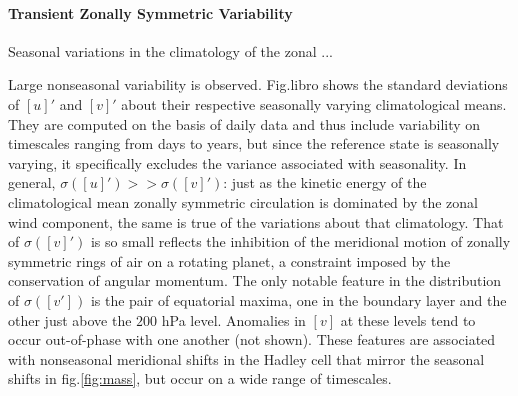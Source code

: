 \paragraph{Transient Zonally Symmetric Variability}
Seasonal variations in the climatology of the zonal ...

Large nonseasonal variability is observed. Fig.libro shows the standard deviations of $[u]'$ and $[v]'$ about their respective seasonally varying climatological means. They are computed on the basis of daily data and thus include variability on timescales ranging from days to years, but since the reference state is seasonally varying, it specifically excludes the variance associated with seasonality. In general, $\sigma([u]')>>\sigma([v]')$: just as the kinetic energy of the climatological mean zonally symmetric circulation is dominated by the zonal wind component, the same is true of the variations about that climatology. That of $\sigma([v]')$ is so small reflects the inhibition of the meridional motion of zonally symmetric rings of air on a rotating planet, a constraint imposed by the conservation of angular momentum. The only notable feature in the distribution of $\sigma([v'])$ is the pair of equatorial maxima, one in the boundary layer and the other just above the $200$ hPa level. Anomalies in $[v]$ at these levels tend to occur out-of-phase with one another (not shown). These features are associated with nonseasonal meridional shifts in the Hadley cell that mirror the seasonal shifts in fig.\ref{fig:mass}, but occur on a wide range of timescales. 

